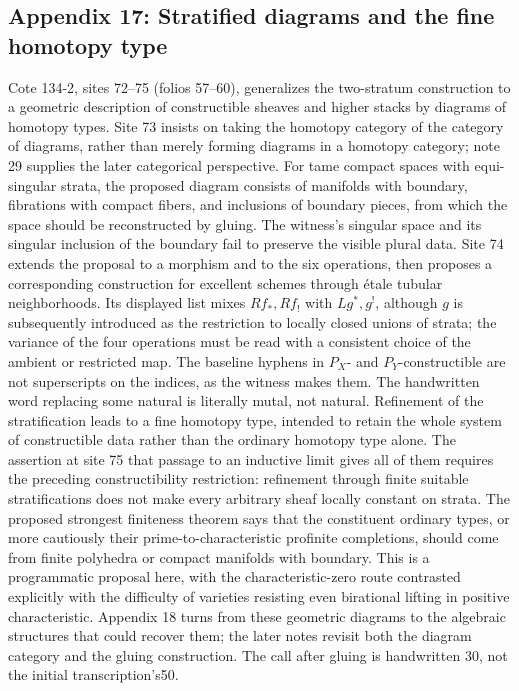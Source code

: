 \documentclass[10pt,oneside]{book}
\begin{document}
\subsection*{Appendix 17: Stratified diagrams and the fine homotopy type}
Cote 134-2, sites 72--75 (folios 57--60), generalizes the two-stratum construction to a geometric description of constructible sheaves and higher stacks by diagrams of homotopy types. Site 73 insists on taking the homotopy category of the category of diagrams, rather than merely forming diagrams in a homotopy category; note 29 supplies the later categorical perspective. For tame compact spaces with equi-singular strata, the proposed diagram consists of manifolds with boundary, fibrations with compact fibers, and inclusions of boundary pieces, from which the space should be reconstructed by gluing. The witness's singular space and its singular inclusion of the boundary fail to preserve the visible plural data. Site 74 extends the proposal to a morphism and to the six operations, then proposes a corresponding construction for excellent schemes through étale tubular neighborhoods. Its displayed list mixes $Rf_*,Rf_!$ with $Lg^*,g^!$, although $g$ is subsequently introduced as the restriction to locally closed unions of strata; the variance of the four operations must be read with a consistent choice of the ambient or restricted map. The baseline hyphens in $P_X$- and $P_Y$-constructible are not superscripts on the indices, as the witness makes them. The handwritten word replacing some natural is literally mutal, not natural. Refinement of the stratification leads to a fine homotopy type, intended to retain the whole system of constructible data rather than the ordinary homotopy type alone. The assertion at site 75 that passage to an inductive limit gives all of them requires the preceding constructibility restriction: refinement through finite suitable stratifications does not make every arbitrary sheaf locally constant on strata. The proposed strongest finiteness theorem says that the constituent ordinary types, or more cautiously their prime-to-characteristic profinite completions, should come from finite polyhedra or compact manifolds with boundary. This is a programmatic proposal here, with the characteristic-zero route contrasted explicitly with the difficulty of varieties resisting even birational lifting in positive characteristic. Appendix 18 turns from these geometric diagrams to the algebraic structures that could recover them; the later notes revisit both the diagram category and the gluing construction. The call after gluing is handwritten 30, not the initial transcription's50.
\end{document}
